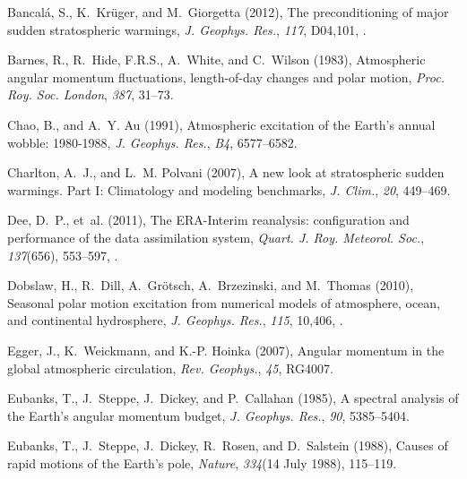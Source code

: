 \documentclass[draft,jgrga]{agutex}
\begin{document}
\begin{article}
\begin{thebibliography}{38}
Bancal{\'a}, S., K.~Kr{\"u}ger, and M.~Giorgetta (2012), The preconditioning of
  major sudden stratospheric warmings, \textit{J. Geophys. Res.}, \textit{117},
  D04,101, .

Barnes, R., R.~Hide, F.R.S., A.~White, and C.~Wilson (1983), Atmospheric
  angular momentum fluctuations, length-of-day changes and polar motion,
  \textit{Proc. Roy. Soc. London}, \textit{387}, 31--73.

Chao, B., and A.~Y. Au (1991), Atmospheric excitation of the {E}arth's annual
  wobble: 1980-1988, \textit{J. Geophys. Res.}, \textit{B4}, 6577--6582.

Charlton, A.~J., and L.~M. Polvani (2007), A new look at stratospheric sudden
  warmings. {Part I}: {Climatology} and modeling benchmarks, \textit{J. Clim.},
  \textit{20}, 449--469.

Dee, D.~P., et~al. (2011), {The ERA-Interim reanalysis: configuration and
  performance of the data assimilation system}, \textit{Quart. J. Roy.
  Meteorol. Soc.}, \textit{137}(656), 553--597, .

Dobslaw, H., R.~Dill, A.~Gr{\"o}tsch, A.~Brzezinski, and M.~Thomas (2010),
  Seasonal polar motion excitation from numerical models of atmosphere, ocean,
  and continental hydrosphere, \textit{J. Geophys. Res.}, \textit{115}, 10,406,
  .

Egger, J., K.~Weickmann, and K.-P. Hoinka (2007), Angular momentum in the
  global atmospheric circulation, \textit{Rev. Geophys.}, \textit{45}, RG4007.

Eubanks, T., J.~Steppe, J.~Dickey, and P.~Callahan (1985), A spectral analysis
  of the {E}arth's angular momentum budget, \textit{J. Geophys. Res.},
  \textit{90}, 5385--5404.

Eubanks, T., J.~Steppe, J.~Dickey, R.~Rosen, and D.~Salstein (1988), Causes of
  rapid motions of the {E}arth's pole, \textit{Nature}, \textit{334}(14 July
  1988), 115--119.


\end{thebibliography}
\end{article}
\end{document}
